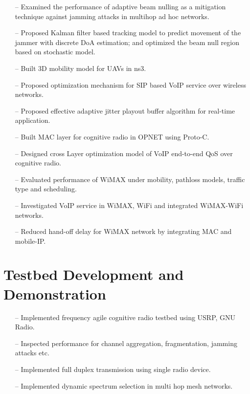 \documentclass[11pt,letterpaper,sans]{moderncv}   %
\begin{document}
  {
  \begin{itemize}
    \item[--] Examined the performance of adaptive beam nulling as a mitigation technique against jamming attacks in multihop ad hoc networks. 
    \item[--] Proposed Kalman filter based tracking model to predict movement of the jammer with discrete DoA estimation; and optimized the beam null region based on stochastic model.
    \item[--] Built 3D mobility model for UAVs in ns3.
  \end{itemize}
  }


  {
  \begin{itemize}
    \item[--] Proposed optimization mechanism for SIP based VoIP service over wireless networks.
    \item[--] Proposed effective adaptive jitter playout buffer algorithm for real-time application.
    \item[--] Built MAC layer for cognitive radio in OPNET using Proto-C.
    \item[--] Designed cross Layer optimization model of VoIP end-to-end QoS over cognitive radio.
  \end{itemize}
  }


  {
  \begin{itemize}
    \item[--] Evaluated performance of WiMAX under mobility, pathloss models, traffic type and scheduling.
    \item[--] Investigated VoIP service in WiMAX, WiFi and integrated WiMAX-WiFi networks.
    \item[--] Reduced hand-off delay for WiMAX network  by integrating  MAC and mobile-IP.
  \end{itemize}
  }


\section{Testbed Development and Demonstration}
  {
  \begin{itemize}
    \item[--] Implemented frequency agile cognitive radio testbed using USRP, GNU Radio.
    \item[--] Inspected performance for channel aggregation, fragmentation, jamming attacks etc.
    \item[--] Implemented full duplex transmission using single radio device.
    \item[--] Implemented dynamic spectrum selection in multi hop mesh networks.
  \end{itemize}
  }
\end{document}

